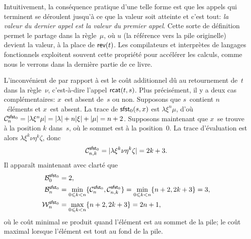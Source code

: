 Intuitivement, la conséquence pratique d'une telle forme est que les
appels qui terminent se déroulent jusqu'à ce que la valeur soit
atteinte et c'est tout: \emph{la valeur du dernier appel est la valeur
du premier appel}. Cette sorte de définition permet le partage dans la
règle~\(\mu\), où \(u\) (la référence vers la pile originelle) devient
la valeur, à la place de \(\fun{rev}(t)\). Les compilateurs et
interprètes de langages fonctionnels exploitent souvent cette
propriété pour accélérer les calculs, comme nous le verrons dans la
dernière partie de ce livre.

L'inconvénient de  par rapport à  est le
coût additionnel dû au retournement de~\(t\) dans la règle~\(\nu\),
c'est-à-dire l'appel \(\fun{rcat}(t,s)\). Plus précisément, il y a
deux cas complémentaires: \(x\)~est absent de~\(s\) ou non. Supposons
que \(s\)~contient \(n\)~éléments et \(x\)~est absent. La trace
 de \(\fun{sfst}_0(s,x)\)
est \(\lambda\xi^n\mu\), d'où \(\C{\fun{sfst}_0}{n} =
\len{\lambda\xi^n\mu} = \len{\lambda} + n \len{\xi} + \len{\mu} = n +
2\). Supposons maintenant que \(x\)~se trouve à la position \(k\)
dans~\(s\), où le sommet est à la position~\(0\). La trace
d'évaluation est alors \(\lambda \xi^{k}\nu\eta^k\zeta\), donc
\begin{equation*}
  \C{\fun{sfst}_0}{n,k} = \len{\lambda \xi^{k}\nu\eta^k\zeta} = 2k + 3.
\end{equation*}
Il apparaît maintenant avec clarté que
\begin{align*}
\B{\fun{sfst}_0}{0} & = 2,\\
\B{\fun{sfst}_0}{n} & = \min_{0 \leqslant k < n}\{\C{\fun{sfst}_0}{n}, \C{\fun{sfst}_0}{n,k}\}
                    = \min_{0 \leqslant k < n}\{n+2,2k+3\} = 3,\\
\W{\fun{sfst}_0}{n} & = \max_{0 \leqslant k < n}\{n+2,2k+3\} = 2n+1,
\end{align*}
où le coût minimal se produit quand l'élément est au sommet de la
pile; le coût maximal lorsque l'élément est tout au fond de la pile.

